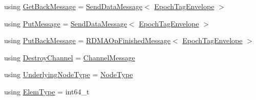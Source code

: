 \begin{DoxyCompactItemize}
\item 
using \hyperlink{namespacevt_1_1rdma_a72a94b92eba75ec9fec43b2a9a4ad878}{Get\+Back\+Message} = \hyperlink{structvt_1_1rdma_1_1_send_data_message}{Send\+Data\+Message}$<$ \hyperlink{namespacevt_af23b58014ced6898422213a0e5e6a27a}{Epoch\+Tag\+Envelope} $>$
\item 
using \hyperlink{namespacevt_1_1rdma_ae0a0330c647ec5ac5d508750f4cd4a06}{Put\+Message} = \hyperlink{structvt_1_1rdma_1_1_send_data_message}{Send\+Data\+Message}$<$ \hyperlink{namespacevt_af23b58014ced6898422213a0e5e6a27a}{Epoch\+Tag\+Envelope} $>$
\item 
using \hyperlink{namespacevt_1_1rdma_a07a52401fe8185d190371b3333dc61ac}{Put\+Back\+Message} = \hyperlink{structvt_1_1rdma_1_1_r_d_m_a_op_finished_message}{R\+D\+M\+A\+Op\+Finished\+Message}$<$ \hyperlink{namespacevt_af23b58014ced6898422213a0e5e6a27a}{Epoch\+Tag\+Envelope} $>$
\item 
using \hyperlink{namespacevt_1_1rdma_a1273aeddd73c1ffac0d7383ef7a314d8}{Destroy\+Channel} = \hyperlink{structvt_1_1rdma_1_1_channel_message}{Channel\+Message}
\item 
using \hyperlink{namespacevt_1_1rdma_a20d01bc82b95453c162d4b9857a4a78a}{Underlying\+Node\+Type} = \hyperlink{namespacevt_a866da9d0efc19c0a1ce79e9e492f47e2}{Node\+Type}
\item 
using \hyperlink{namespacevt_1_1rdma_a38e310504e675aa1bcaf7811019b0df2}{Elem\+Type} = int64\+\_\+t
\end{DoxyCompactItemize}
